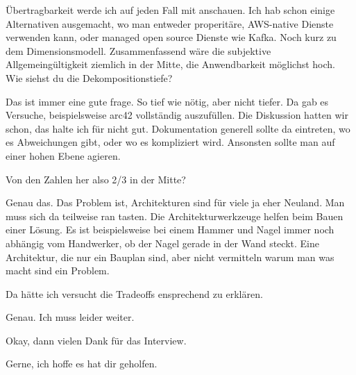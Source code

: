 \LF Übertragbarkeit werde ich auf jeden Fall mit anschauen. Ich hab schon einige Alternativen ausgemacht, wo man entweder properitäre, \ac{AWS}-native Dienste verwenden kann, oder managed open source Dienste wie Kafka. Noch kurz zu dem Dimensionsmodell. Zusammenfassend wäre die subjektive Allgemeingültigkeit ziemlich in der Mitte, die Anwendbarkeit möglichst hoch. Wie siehst du die Dekompositionstiefe?

\RB Das ist immer eine gute frage. So tief wie nötig, aber nicht tiefer. Da gab es Versuche, beispielsweise arc42 vollständig auszufüllen. Die Diskussion hatten wir schon, das halte ich für nicht gut. Dokumentation generell sollte da eintreten, wo es Abweichungen gibt, oder wo es kompliziert wird. Ansonsten sollte man auf einer hohen Ebene agieren.

\LF Von den Zahlen her also 2/3 in der Mitte?

\RB Genau das. Das Problem ist, Architekturen sind für viele ja eher Neuland. Man muss sich da teilweise ran tasten. Die Architekturwerkzeuge helfen beim Bauen einer Lösung. Es ist beispielsweise bei einem Hammer und Nagel immer noch abhängig vom Handwerker, ob der Nagel gerade in der Wand steckt. Eine Architektur, die nur ein Bauplan sind, aber nicht vermitteln warum man was macht sind ein Problem.

\LF Da hätte ich versucht die Tradeoffs ensprechend zu erklären.

\RB Genau. Ich muss leider weiter.

\LF Okay, dann vielen Dank für das Interview.

\RB Gerne, ich hoffe es hat dir geholfen.
